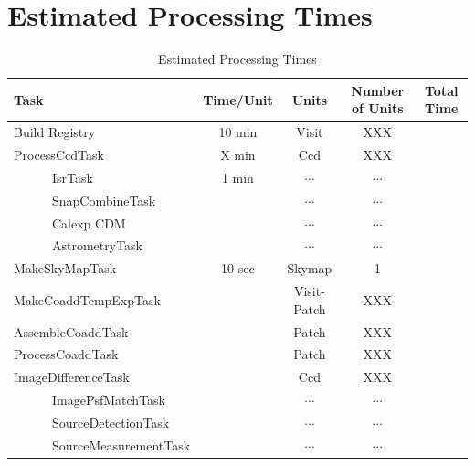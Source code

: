\documentclass[12pt]{article}
\begin{document}

\clearpage 
\section{Estimated Processing Times} 

\begin{table}[h]
\small
\begin{center}
\caption{\label{tab-pars} Estimated Processing Times}
\begin{tabular}{lcccc}
\hline \hline
Task                          & Time/Unit     & Units        & Number of Units & Total Time\\
\hline
Build Registry                & 10 min        & Visit        & XXX             &           \\ 
ProcessCcdTask                & X min         & Ccd          & XXX             &           \\ %
~~~~~~IsrTask                 & 1 min         & $\cdots$     & $\cdots$        &           \\
~~~~~~SnapCombineTask         &               & $\cdots$     & $\cdots$        &           \\
~~~~~~Calexp CDM              &               & $\cdots$     & $\cdots$        &           \\
~~~~~~AstrometryTask          &               & $\cdots$     & $\cdots$        &           \\
MakeSkyMapTask                & 10 sec        & Skymap       & 1               &           \\
MakeCoaddTempExpTask          &               & Visit-Patch  & XXX             &           \\
AssembleCoaddTask             &               & Patch        & XXX             &           \\   
ProcessCoaddTask              &               & Patch        & XXX             &           \\
ImageDifferenceTask           &               & Ccd          & XXX             &           \\
~~~~~~ImagePsfMatchTask       &               & $\cdots$     & $\cdots$        &           \\
~~~~~~SourceDetectionTask     &               & $\cdots$     & $\cdots$        &           \\
~~~~~~SourceMeasurementTask   &               & $\cdots$     & $\cdots$        &           \\

\end{tabular}
\end{center}
\end{table}
\end{document}
